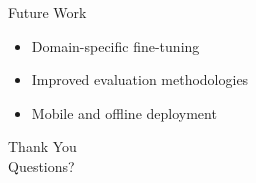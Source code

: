 \documentclass{beamer}
\begin{document}
\begin{frame}{Future Work}
\begin{itemize}
    \item Domain-specific fine-tuning
    \item Improved evaluation methodologies
    \item Mobile and offline deployment
\end{itemize}
\end{frame}

\begin{frame}
\centering
\Huge{Thank You}\\
\vspace{0.5cm}
\Large{Questions?}
\end{frame}
\end{document}
